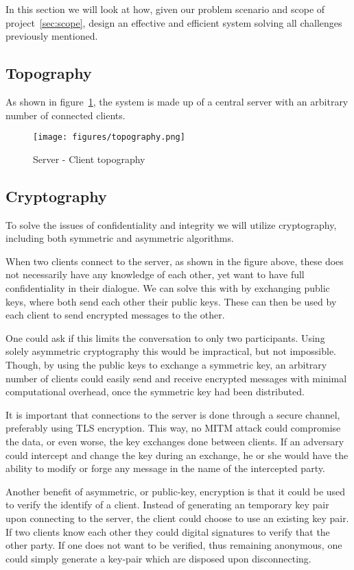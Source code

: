 
In this section we will look at how, given our problem
scenario and scope of project~\ref{sec:scope},
design an effective and efficient system solving all
challenges previously mentioned.


\subsection{Topography}

As shown in figure~\ref{fig:topo}, the system is made up of
a central server with an arbitrary number of connected clients.

\begin{figure}[ht]
  \centering
  \texttt{[image: figures/topography.png]}
  \caption{\label{fig:topo} Server - Client topography}
\end{figure}


\subsection{Cryptography}

To solve the issues of confidentiality and integrity we will utilize
cryptography, including both symmetric and asymmetric algorithms.

When two clients connect to the server, as shown in the figure above,
these does not necessarily have any knowledge of each other, yet want
to have full confidentiality in their dialogue. We can solve this with
by exchanging public keys, where both send each other their public
keys. These can then be used by each client to send encrypted messages
to the other.

One could ask if this limits the conversation to only two
participants. Using solely asymmetric cryptography this would be
impractical, but not impossible. Though, by using the public keys to
exchange a symmetric key, an arbitrary number of clients could easily
send and receive encrypted messages with minimal computational
overhead, once the symmetric key had been distributed.

It is important that connections to the server is done through a
secure channel, preferably using TLS encryption. This way, no MITM
attack could compromise the data, or even worse, the key exchanges
done between clients. If an adversary could intercept and change the
key during an exchange, he or she would have the ability to modify or
forge any message in the name of the intercepted party.

Another benefit of asymmetric, or public-key, encryption is that it
could be used to verify the identify of a client. Instead of
generating an temporary key pair upon connecting to the server, the
client could choose to use an existing key pair. If two clients know
each other they could digital signatures to verify that the other
party. If one does not want to be verified, thus remaining anonymous,
one could simply generate a key-pair which are disposed upon
disconnecting.
